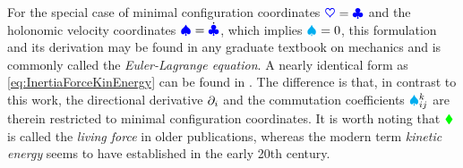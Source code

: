 For the special case of minimal configuration coordinates $\boldsymbol{\textcolor{blue}{\heartsuit}}=\boldsymbol{\textcolor{blue}{\clubsuit}}$ and the holonomic velocity coordinates $\boldsymbol{\textcolor{blue}{\spadesuit}}=\dot{\boldsymbol{\textcolor{blue}{\clubsuit}}}$, which implies $\textcolor{cyan}{\spadesuit}^{}_{} = 0$, this formulation and its derivation may be found in any graduate textbook on mechanics and is commonly called the \textit{Euler-Lagrange equation}.
A nearly identical form as \eqref{eq:InertiaForceKinEnergy} can be found in \cite[p.\ 17]{Hamel:LagrangeEuler}.
The difference is that, in contrast to this work, the directional derivative $\partial_{i}$ and the commutation coefficients $\textcolor{cyan}{\spadesuit}^{k}_{ij}$ are therein restricted to minimal configuration coordinates. 
It is worth noting that $\textcolor{green}{\blacklozenge}$ is called the \textit{living force} in older publications, whereas the modern term \textit{kinetic energy} seems to have established in the early 20th century.



